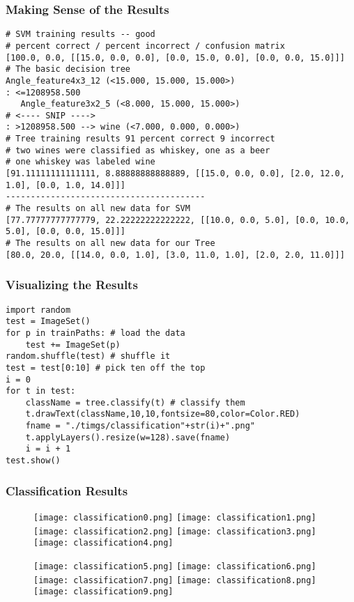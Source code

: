 \documentclass[compress]{beamer}
\begin{document}
\begin{frame}[fragile] 
\frametitle{Making Sense of the Results}
\begin{example}
\begin{verbatim}
# SVM training results -- good
# percent correct / percent incorrect / confusion matrix
[100.0, 0.0, [[15.0, 0.0, 0.0], [0.0, 15.0, 0.0], [0.0, 0.0, 15.0]]]
# The basic decision tree
Angle_feature4x3_12 (<15.000, 15.000, 15.000>) 
: <=1208958.500 
   Angle_feature3x2_5 (<8.000, 15.000, 15.000>) 
# <---- SNIP ----> 
: >1208958.500 --> wine (<7.000, 0.000, 0.000>)
# Tree training results 91 percent correct 9 incorrect 
# two wines were classified as whiskey, one as a beer
# one whiskey was labeled wine 
[91.11111111111111, 8.88888888888889, [[15.0, 0.0, 0.0], [2.0, 12.0, 1.0], [0.0, 1.0, 14.0]]]
----------------------------------------
# The results on all new data for SVM
[77.77777777777779, 22.22222222222222, [[10.0, 0.0, 5.0], [0.0, 10.0, 5.0], [0.0, 0.0, 15.0]]]
# The results on all new data for our Tree
[80.0, 20.0, [[14.0, 0.0, 1.0], [3.0, 11.0, 1.0], [2.0, 2.0, 11.0]]]
\end{verbatim}
\end{example}
\end{frame} 
\begin{frame}[fragile] 
\frametitle{Visualizing the Results}
\begin{example}
\begin{verbatim}
import random
test = ImageSet()
for p in trainPaths: # load the data
    test += ImageSet(p)
random.shuffle(test) # shuffle it
test = test[0:10] # pick ten off the top
i = 0
for t in test:
    className = tree.classify(t) # classify them
    t.drawText(className,10,10,fontsize=80,color=Color.RED)
    fname = "./timgs/classification"+str(i)+".png"
    t.applyLayers().resize(w=128).save(fname)
    i = i + 1
test.show()
\end{verbatim}
\end{example}
\end{frame} 
\begin{frame}
\frametitle{Classification Results}
 \begin{figure}
     \texttt{[image: classification0.png]}
     \quad
     \texttt{[image: classification1.png]}
     \quad
     \texttt{[image: classification2.png]}
     \quad
     \texttt{[image: classification3.png]}
     \quad
     \texttt{[image: classification4.png]}
 \end{figure}
 \begin{figure}
     \texttt{[image: classification5.png]}
     \quad
     \texttt{[image: classification6.png]}
     \quad
     \texttt{[image: classification7.png]}
     \quad
     \texttt{[image: classification8.png]}
     \quad
     \texttt{[image: classification9.png]}
 \end{figure}
\end{frame}
\end{document}

